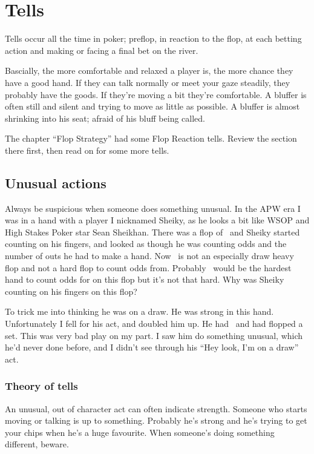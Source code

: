 \chapter{Tells}


Tells occur all the time in poker; preflop, in reaction to the flop,
at each betting action and making or facing a final bet on the river.

Bascially, the more comfortable and relaxed a player is, the more
chance they have a good hand. If they can talk normally or meet your
gaze steadily, they probably have the goods. If they're moving a bit
they're comfortable. A bluffer is often still and silent and trying to
move as little as possible. A bluffer is almost shrinking into his
seat; afraid of his bluff being called.

The chapter ``Flop Strategy'' had some Flop Reaction tells. 
Review the section there first, then read on for some more tells.

\section{Unusual actions}

Always be suspicious when someone does something unusual.
In the APW era I was in a hand with a player I nicknamed Sheiky, as
he looks a bit like WSOP and High Stakes Poker star Sean Sheikhan.
There was a flop of \Kc\nined\sevd\, and Sheiky started counting on his
fingers, and looked as though he was counting odds and the number
of outs he had to make a hand. Now \Kc\nined\sevd\ is not an especially
draw heavy flop and not a hard flop to count odds from. Probably
\Qd\tens\ would be the hardest hand to count odds for on this flop but
it's not that hard. Why was Sheiky counting on his fingers on this
flop?

To trick me into thinking he was on a draw. He was strong in
this hand. Unfortunately I fell for his act, and doubled him up.
He had \ninec\nineh\, and had flopped a set. This
was very bad play on my part. I saw him do something unusual, which
he'd never done before, and I didn't see through his
``Hey look, I'm on a draw'' act.

\subsection{Theory of tells}

An unusual, out of character act can often indicate
strength. Someone who starts moving or talking is up to something.
Probably he's strong and he's trying to get your chips when he's
a huge favourite. When someone's doing something different, beware.


